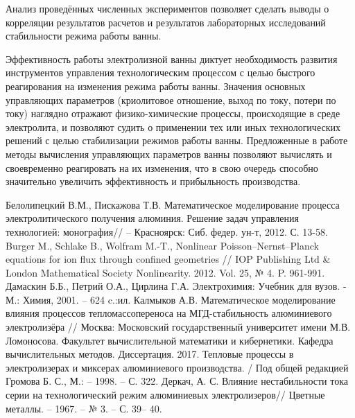 \documentclass[]{pmi}
\begin{document}
Анализ проведённых численных экспериментов позволяет сделать выводы о корреляции результатов расчетов и результатов лабораторных исследований стабильности режима работы ванны.


Эффективность работы электролизной ванны диктует необходимость развития инструментов управления технологическим процессом с целью быстрого реагирования на изменения режима работы ванны. Значения основных управляющих параметров (криолитовое отношение, выход по току, потери по току) наглядно отражают физико-химические процессы, происходящие в среде электролита, и позволяют судить о применении тех или иных технологических решений с целью стабилизации режимов работы ванны. Предложенные в работе методы вычисления управляющих параметров ванны позволяют вычислять и своевременно реагировать на их изменения, что в свою очередь способно значительно увеличить эффективность и прибыльность производства.

\begin{thebibliography}{}

	 Белолипецкий В.М., Пискажова Т.В. Математическое моделирование процесса электролитического получения алюминия. Решение задач управления технологией: монография// – Красноярск: Сиб. федер. ун-т, 2012. С. 13-58.
	 Burger M., Schlake B., Wolfram M.-T., Nonlinear Poisson–Nernst–Planck equations for ion flux through confined geometries // IOP Publishing Ltd \& London Mathematical Society Nonlinearity. 2012. Vol. 25, № 4. P. 961-991.
	 Дамаскин Б.Б., Петрий О.А., Цирлина Г.А. Электрохимия: Учебник для вузов. -  М.: Химия, 2001. – 624 c.:ил.
	 Калмыков А.В. Математическое моделирование влияния процессов тепломассопереноса на МГД-стабильность алюминиевого электролизёра // Москва: Московский государственный университет имени М.В. Ломоносова. Факультет вычислительной математики и кибернетики. Кафедра вычислительных методов. Диссертация. 2017.
	 Тепловые процессы в электролизерах и миксерах алюминиевого производства. / Под общей редакцией Громова Б. С., М.: – 1998. – С. 322.
	Деркач, А. С. Влияние нестабильности тока серии на технологический режим алюминиевых электролизеров// Цветные металлы. – 1967. – № 3. – С. 39– 40.

\end{thebibliography}
\end{document}
